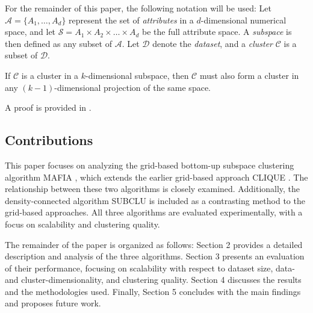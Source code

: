 For the remainder of this paper, the following notation will be used: Let $\mathcal{A} = \{A_1, \dots, A_d\}$ represent the set of \textit{attributes} in a $d$-dimensional numerical space, and let $\mathcal{S} = A_1 \times A_2 \times \dots \times A_d$ be the full attribute space. A \textit{subspace} is then defined as any subset of $\mathcal{A}$. Let $\mathcal{D}$ denote the \textit{dataset}, and a \textit{cluster} $\mathcal{C}$ is a subset of $\mathcal{D}$.

\begin{lemma}\label{lem:mono}
    If $\mathcal{C}$ is a cluster in a $k$-dimensional subspace, then $\mathcal{C}$ must also form a cluster in any $(k-1)$-dimensional projection of the same space.
\end{lemma}
A proof is provided in \cite{clique}.

\subsection{Contributions}
This paper focuses on analyzing the grid-based bottom-up subspace clustering algorithm MAFIA \cite{mafia}, which extends the earlier grid-based approach CLIQUE \cite{clique}. The relationship between these two algorithms is closely examined. Additionally, the density-connected algorithm SUBCLU \cite{subclu} is included as a contrasting method to the grid-based approaches. All three algorithms are evaluated experimentally, with a focus on scalability and clustering quality.

The remainder of the paper is organized as follows: Section 2 provides a detailed description and analysis of the three algorithms. Section 3 presents an evaluation of their performance, focusing on scalability with respect to dataset size, data- and cluster-dimensionality, and clustering quality. Section 4 discusses the results and the methodologies used. Finally, Section 5 concludes with the main findings and proposes future work.